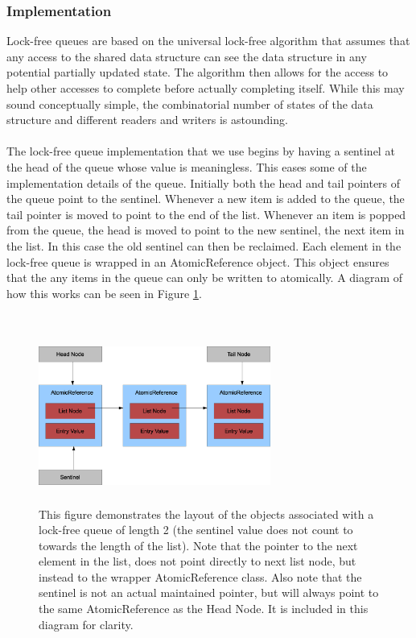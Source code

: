 \documentclass[twocolumn]{article}
\begin{document}
\subsubsection{Implementation}
Lock-free queues are based on the universal lock-free algorithm
\cite{LF} that assumes that any access to the shared data structure can
see the data structure in any potential partially updated state.  The
algorithm then allows for the access to help other accesses to
complete before actually completing itself.  While this may sound
conceptually simple, the combinatorial number of states of the data
structure and different readers and writers is astounding.\\
~\\
The lock-free queue implementation that we use begins by having a sentinel
at the head of the queue whose value is meaningless.  This eases some of
the implementation details of the queue.  Initially both the head and tail
pointers of the queue point to the sentinel.  Whenever a new item is added
to the queue, the tail pointer is moved to point to the end of the list.
Whenever an item is popped from the queue, the head is moved to point to
the new sentinel, the next item in the list.  In this case the old
sentinel can then be reclaimed.  Each element in the lock-free queue is
wrapped in an AtomicReference object.  This object ensures that the any
items in the queue can only be written to atomically.  A diagram of how
this works can be seen in Figure \ref{lfqueue}.\\
~\\
\begin{figure}[h]
\centering
\includegraphics[width=3in, height=2.25in]{lfqueue.eps}
\caption{This figure demonstrates the layout of the objects associated with a lock-free queue of length 2 (the sentinel value does not count to towards the length of the list).  Note that the pointer to the next element in the list, does not point directly to next list node, but instead to the wrapper AtomicReference class.  Also note that the sentinel is not an actual maintained pointer, but will always point to the same AtomicReference as the Head Node.  It is included in this diagram for clarity.}
\label{lfqueue}
\end{figure}
\end{document}
